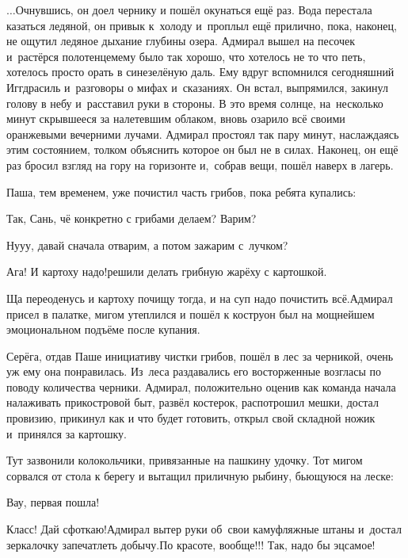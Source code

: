 \vspace{0.1cm}
$\ldots$Очнувшись, он доел чернику и пошёл окунаться ещё раз. Вода перестала казаться ледяной, он привык к~холоду и~проплыл ещё прилично, пока, наконец, не ощутил ледяное дыхание глубины озера. Адмирал вышел на песочек и~растёрся полотенцем\mdash ему было так хорошо, что хотелось не то что петь, хотелось просто орать в сине\sdash зелёную даль. Ему вдруг вспомнился сегодняшний Иггдрасиль и~разговоры о мифах и~сказаниях. Он встал, выпрямился, закинул голову в небу и~расставил руки в стороны. В это время солнце, на~несколько минут скрывшееся за налетевшим облаком, вновь озарило всё своими оранжевыми вечерними лучами. Адмирал простоял так пару минут, наслаждаясь этим состоянием, толком объяснить которое он был не в силах. Наконец, он ещё раз бросил взгляд на гору на горизонте и,~собрав вещи, пошёл наверх в лагерь.

Паша, тем временем, уже почистил часть грибов, пока ребята купались:

\diagdash Так, Сань, чё конкретно с грибами делаем? Варим?%

\diagdash Ну\sdash у\sdash у, давай сначала отварим, а потом зажарим с~лучком?

\diagdash Ага! И картоху надо!\mdash решили делать грибную жарёху с картошкой.

\diagdash Ща переоденусь и картоху почищу тогда, и на суп надо почистить всё.\mdash Адмирал присел в палатке, мигом утеплился и пошёл к костру\mdash он был на мощнейшем эмоциональном подъёме после купания.

Серёга, отдав Паше инициативу чистки грибов, пошёл в лес за черникой, очень уж ему она понравилась. Из~леса раздавались его восторженные возгласы по поводу количества черники. Адмирал, положительно оценив как команда начала налаживать прикостровой быт, развёл костерок, распотрошил мешки, достал провизию, прикинул как и что будет готовить, открыл свой складной ножик и~принялся за картошку.

Тут зазвонили колокольчики, привязанные на пашкину удочку. Тот мигом сорвался от стола к берегу и вытащил приличную рыбину, бьющуюся на леске:

\diagdash Вау, первая пошла!


\diagdash Класс! Дай сфоткаю!\mdash Адмирал вытер руки об~свои камуфляжные штаны и~достал зеркалочку запечатлеть добычу.\mdash По красоте, вообще!!! Так, надо бы эц\sdash самое!

